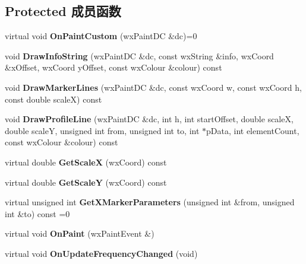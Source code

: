 \subsection*{Protected 成员函数}
\begin{DoxyCompactItemize}
\item 
\hypertarget{class_plot_canvas_ab8ac41fbe7a62af7228c4544d25a1661}{virtual void {\bfseries On\+Paint\+Custom} (wx\+Paint\+D\+C \&dc)=0}\label{class_plot_canvas_ab8ac41fbe7a62af7228c4544d25a1661}

\item 
\hypertarget{class_plot_canvas_a7d33e169a519f3c8173514deed67c954}{void {\bfseries Draw\+Info\+String} (wx\+Paint\+D\+C \&dc, const wx\+String \&info, wx\+Coord \&x\+Offset, wx\+Coord y\+Offset, const wx\+Colour \&colour) const }\label{class_plot_canvas_a7d33e169a519f3c8173514deed67c954}

\item 
\hypertarget{class_plot_canvas_ab408942eaa307fd7e14cdc0693e080c4}{void {\bfseries Draw\+Marker\+Lines} (wx\+Paint\+D\+C \&dc, const wx\+Coord w, const wx\+Coord h, const double scale\+X) const }\label{class_plot_canvas_ab408942eaa307fd7e14cdc0693e080c4}

\item 
\hypertarget{class_plot_canvas_a002a805720751e56824734cfe42027ef}{void {\bfseries Draw\+Profile\+Line} (wx\+Paint\+D\+C \&dc, int h, int start\+Offset, double scale\+X, double scale\+Y, unsigned int from, unsigned int to, int $\ast$p\+Data, int element\+Count, const wx\+Colour \&colour) const }\label{class_plot_canvas_a002a805720751e56824734cfe42027ef}

\item 
\hypertarget{class_plot_canvas_a61a712fb45b875da1ac93324ee8d6d87}{virtual double {\bfseries Get\+Scale\+X} (wx\+Coord) const }\label{class_plot_canvas_a61a712fb45b875da1ac93324ee8d6d87}

\item 
\hypertarget{class_plot_canvas_a9c5bbc8dbb636e5d53a0a0859e0707b5}{virtual double {\bfseries Get\+Scale\+Y} (wx\+Coord) const }\label{class_plot_canvas_a9c5bbc8dbb636e5d53a0a0859e0707b5}

\item 
\hypertarget{class_plot_canvas_a271de403c21aec07d1c8c54310a05b6b}{virtual unsigned int {\bfseries Get\+X\+Marker\+Parameters} (unsigned int \&from, unsigned int \&to) const =0}\label{class_plot_canvas_a271de403c21aec07d1c8c54310a05b6b}

\item 
\hypertarget{class_plot_canvas_af30951c51b13bc973a93675ad3b31f5b}{virtual void {\bfseries On\+Paint} (wx\+Paint\+Event \&)}\label{class_plot_canvas_af30951c51b13bc973a93675ad3b31f5b}

\item 
\hypertarget{class_plot_canvas_abeb512d4044ba2fe5943be89be7909bd}{virtual void {\bfseries On\+Update\+Frequency\+Changed} (void)}\label{class_plot_canvas_abeb512d4044ba2fe5943be89be7909bd}

\end{DoxyCompactItemize}
